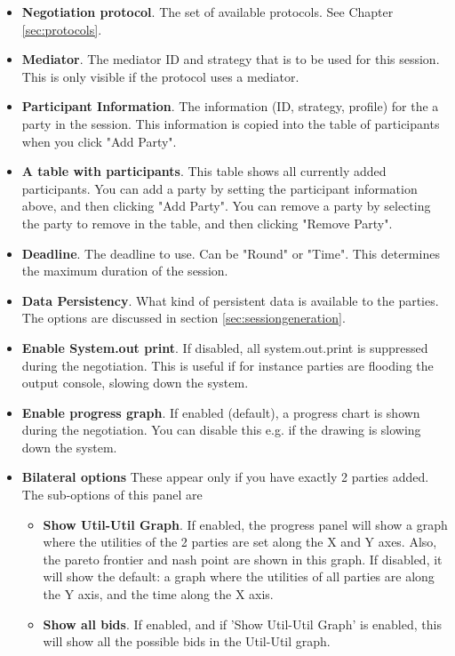 \documentclass[]{llncs}
\begin{document}
\medskip
\begin{minipage}{.8 \textwidth}
\begin{itemize}
	\item \textbf{Negotiation protocol}. The set of available protocols. See Chapter \ref{sec:protocols}.
	\item \textbf{Mediator}. The mediator ID and strategy that is to be used for this session. This is only visible if the protocol uses a mediator.
	\item \textbf{Participant Information}. The information (ID, strategy, profile) for the a party in the session. This information is copied into the table of participants when you click "Add Party".
	\item \textbf{A table with participants}. This table shows all currently added participants. You can add a party by setting the participant information above, and then clicking "Add Party". You can remove a party by selecting the party to remove in the table, and then clicking "Remove Party". 
	\item \textbf{Deadline}. The deadline to use. Can be "Round" or "Time". This determines the maximum duration of the session.
	\item \textbf{Data Persistency}. What kind of persistent data is available to the parties. The options are discussed in section \ref{sec:sessiongeneration}.
	\item \textbf{Enable System.out print}. If disabled, all system.out.print is suppressed during the negotiation. This is useful if for instance parties are flooding the output console, slowing down the system.
		\item \textbf{Enable progress graph}. If enabled (default), a progress chart is shown during the negotiation. You can disable this e.g. if the drawing is slowing down the system.
\item \textbf{Bilateral options} These appear only if you have exactly 2 parties added. The sub-options of this panel are
	\begin{itemize}
	\item \textbf{Show Util-Util Graph}. If enabled, the progress panel will show a graph where the utilities of the 2 parties are set along the X and Y axes. Also, the pareto frontier and nash point are shown in this graph. If disabled, it will show the default: a graph where the utilities of all parties are along the Y axis, and the time along the X axis. 
	\item \textbf{Show all bids}.  If enabled, and if 'Show Util-Util Graph' is enabled, this will show all the possible bids in the Util-Util graph.
	\end{itemize}

\end{itemize}
\end{minipage}
\medskip
\end{document}
